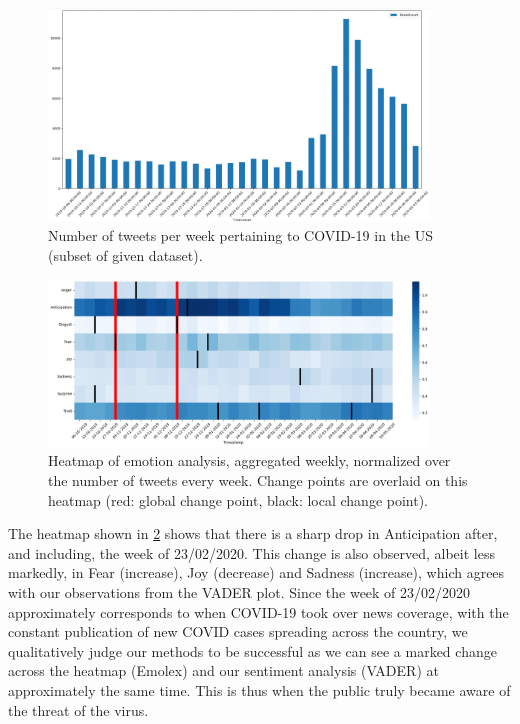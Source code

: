 \begin{figure}
    \centering
    \includegraphics[width=0.9\textwidth]{images/p3_fig11.png}
    \caption{Number of tweets per week pertaining to COVID-19 in the US (subset of given dataset).}
    \label{fig:p3-fig11}
\end{figure}
\begin{figure}
    \centering
    \includegraphics[width=0.9\textwidth]{images/p3_fig12.png}
    \caption{Heatmap of emotion analysis, aggregated weekly, normalized over the number of tweets every week. Change points are overlaid on this heatmap (red: global change point, black: local change point).}
    \label{fig:p3-fig12}
\end{figure}

The heatmap shown in \cref{fig:p3-fig12} shows that there is a sharp drop in Anticipation after, and including, the week of 23/02/2020. This change is also observed, albeit less markedly, in Fear (increase), Joy (decrease) and Sadness (increase), which agrees with our observations from the VADER plot. Since the week of 23/02/2020 approximately corresponds to when COVID-19 took over news coverage, with the constant publication of new COVID cases spreading across the country, we qualitatively judge our methods to be successful as we can see a marked change across the heatmap (Emolex) and our sentiment analysis (VADER) at approximately the same time. This is thus when the public truly became aware of the threat of the virus.

